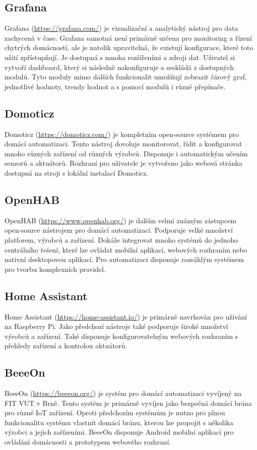 \documentclass[11pt,a4paper]{article}
\begin{document}
\subsection{Grafana}
Grafana (\url{https://grafana.com/}) je vizualizační a analytický nástroj pro data zachycená v čase. Grafana samotná není primárně určena pro monitoring a řízení chytrých domácností, ale je natolik upravitelná, že existují konfigurace, které toto užití zpřístupňují. Je dostupná s mnoha rozšířeními a zdroji dat. Uživatel si vytvoří dashboard, který si následně nakonfiguruje a seskládá z dostupných modulů. Tyto moduly mimo dalších funkcionalit umožňují zobrazit čárový graf, jednotlivé hodnoty, trendy hodnot a s pomocí modulů i různé přepínače.

\subsection{Domoticz}
Domoticz (\url{https://domoticz.com/}) je kompletním open-source systémem pro domácí automatizaci. Tento nástroj dovoluje monitorovat, řídit a konfigurovat mnoho různých zařízení od různých výrobců. Disponuje i automatickým učením senzorů a aktuátorů. Rozhraní pro uživatele je vytvořeno jako webová stránka dostupná na stroji s lokální instalací Domoticz.

\subsection{OpenHAB}
OpenHAB (\url{https://www.openhab.org/}) je dalším velmi známým zástupcem open-source nástrojem pro domácí automatizaci. Podporuje velké množství platforem, výrobců a zařízení. Dokáže integrovat mnoho systémů do jednoho centrálního řešení, které lze ovládat mobilní aplikací, webových rozhraním nebo nativní desktopovou aplikací. Pro automatizaci disponuje rozsáhlým systémem pro tvorbu komplexních pravidel.

\subsection{Home Assistant}
Home Assistant (\url{https://home-assistant.io/}) je primárně navrhován pro užívání na Raspberry Pi. Jako předchozí nástroje také podporuje široké množství výrobců a zařízení. Také disponuje konfigurovatelným webových rozhraním s přehledy zařízení a kontrolou aktuátorů.

\subsection{BeeeOn}
BeeeOn (\url{https://beeeon.org/}) je systém pro domácí automatizaci vyvíjený na FIT VUT v Brně. Tento systém je primárně vyvíjen jako bezpečná domácí brána pro různé IoT zařízení. Oproti předchozím systémům je nutno pro plnou funkcionalitu systému vlastnit domácí bránu, kterou lze propojit s několika výrobci a jejich zařízeními. BeeeOn disponuje Android mobilní aplikací pro ovládání domácnosti a prototypem webového rozhraní.
\end{document}
